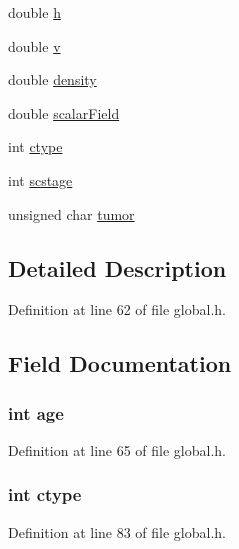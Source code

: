 \begin{DoxyCompactItemize}
\item 
double \hyperlink{structcellData_a8ee9be1b5aa75abae556de3088cba6d9}{h}
\item 
double \hyperlink{structcellData_a3b90d5a73541ab9402511d87bed076ef}{v}
\item 
double \hyperlink{structcellData_a6f8c052f8417728038991f7f2826d38d}{density}
\item 
double \hyperlink{structcellData_a0045a5036d7f3f873fe33380932d4313}{scalar\-Field}
\item 
int \hyperlink{structcellData_a13fbf3c17594503f639a7ef768ea73bb}{ctype}
\item 
int \hyperlink{structcellData_addbb21027771706513a66fdf00c123f3}{scstage}
\item 
unsigned char \hyperlink{structcellData_a49af8c5336d6c2401bc24f86dbb97b36}{tumor}
\end{DoxyCompactItemize}


\subsection{Detailed Description}


Definition at line 62 of file global.\-h.



\subsection{Field Documentation}
\hypertarget{structcellData_a91d98a856bbd96810b40af3ca5cc901a}{
\subsubsection[{age}]{\setlength{\rightskip}{0pt plus 5cm}int age}}\label{structcellData_a91d98a856bbd96810b40af3ca5cc901a}


Definition at line 65 of file global.\-h.

\hypertarget{structcellData_a13fbf3c17594503f639a7ef768ea73bb}{
\subsubsection[{ctype}]{\setlength{\rightskip}{0pt plus 5cm}int ctype}}\label{structcellData_a13fbf3c17594503f639a7ef768ea73bb}


Definition at line 83 of file global.\-h.

